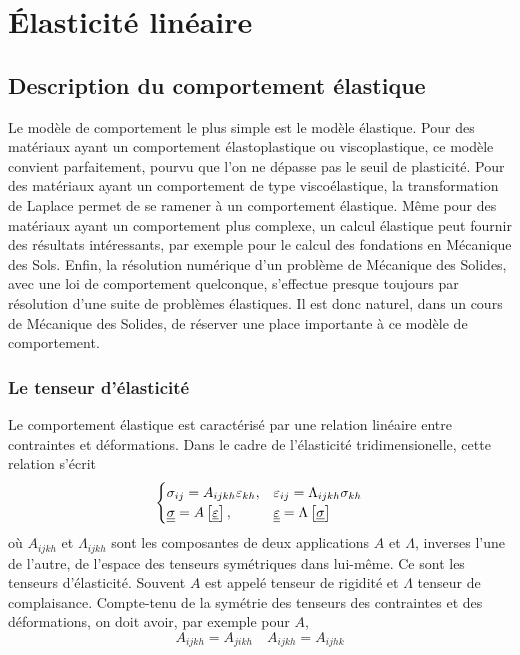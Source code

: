\chapter{Élasticité linéaire}
\section{Description du comportement élastique} \label{sec:Ch5-1}
Le modèle de comportement le plus simple est le modèle élastique.
Pour des matériaux ayant un comportement élastoplastique ou viscoplastique, ce modèle convient parfaitement, pourvu que l'on ne dépasse pas le seuil de plasticité.
Pour des matériaux ayant un comportement de type viscoélastique, la transformation de Laplace permet de se ramener à un comportement élastique.
Même pour des matériaux ayant un comportement plus complexe, un calcul élastique peut fournir des résultats intéressants, par exemple pour le calcul des fondations en Mécanique des Sols.
Enfin, la résolution numérique d'un problème de Mécanique des Solides, avec une loi de comportement quelconque, s'effectue presque toujours par résolution d'une suite de problèmes élastiques.
Il est donc naturel, dans un cours de Mécanique des Solides, de réserver une place importante à ce modèle de comportement.

\subsection{Le tenseur d'élasticité} \label{ssec:Ch5-1.1}
Le comportement élastique est caractérisé par une relation linéaire entre contraintes et déformations.
Dans le cadre de l'élasticité tridimensionelle, cette relation s'écrit
\begin{equation}
    \begin{cases}
        \sigma_{ij} = A_{ijkh} \varepsilon_{kh}, & \varepsilon_{ij} = \Lambda_{ijkh} \sigma_{kh} \\
        \underline{\underline{\sigma}} = A \left[ \underline{\underline{\varepsilon}} \right], & \underline{\underline{\varepsilon}} = \Lambda \left[ \underline{\underline{\sigma}} \right]
    \end{cases}
    \label{eq:Ch05-001}
\end{equation}
où $A_{ijkh}$ et $\Lambda_{ijkh}$ sont les composantes de deux applications $A$ et $\Lambda$, inverses l'une de l'autre, de l'espace des tenseurs symétriques dans lui-même.
Ce sont les tenseurs d'élasticité.
Souvent $A$ est appelé tenseur de rigidité et $\Lambda$ tenseur de complaisance.
Compte-tenu de la symétrie des tenseurs des contraintes et des déformations, on doit avoir, par exemple pour $A$,
\begin{equation}
    A_{ijkh} = A_{jikh} \quad A_{ijkh} = A_{ijhk}
    \label{eq:Ch05-002}
\end{equation}

